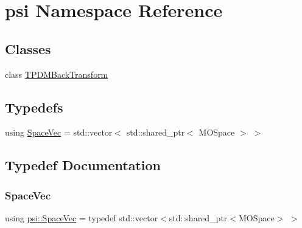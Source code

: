 \hypertarget{namespacepsi}{}\section{psi Namespace Reference}
\label{namespacepsi}
\subsection*{Classes}
\begin{DoxyCompactItemize}
\item 
class \mbox{\hyperlink{classpsi_1_1_t_p_d_m_back_transform}{T\+P\+D\+M\+Back\+Transform}}
\end{DoxyCompactItemize}
\subsection*{Typedefs}
\begin{DoxyCompactItemize}
\item 
using \mbox{\hyperlink{namespacepsi_ad84f5058fdd5b69df3b06b9959251147}{Space\+Vec}} = std\+::vector$<$ std\+::shared\+\_\+ptr$<$ M\+O\+Space $>$ $>$
\end{DoxyCompactItemize}


\subsection{Typedef Documentation}
\mbox{\label{namespacepsi_ad84f5058fdd5b69df3b06b9959251147}} 
\subsubsection{\texorpdfstring{Space\+Vec}{SpaceVec}}
{\footnotesize\ttfamily using \mbox{\hyperlink{namespacepsi_ad84f5058fdd5b69df3b06b9959251147}{psi\+::\+Space\+Vec}} = typedef std\+::vector$<$std\+::shared\+\_\+ptr$<$M\+O\+Space$>$ $>$}

